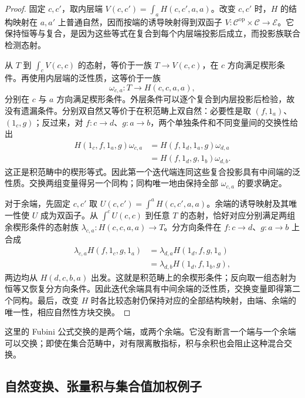 \begin{proof}
	固定 \(c,c'\)，取内层端 \(V(c,c')=\int_aH(c,c',a,a)\)。改变 \(c,c'\) 时，\(H\) 的结构映射在 \(a,a'\) 上普通自然，因而按端的诱导映射得到双函子 \(V:\mathcal C^{\mathrm{op}}\times\mathcal C\rightarrow\mathcal E\)。它保持恒等与复合，是因为这些等式在复合到每个内层端投影后成立，而投影族联合检测态射。

	从 \(T\) 到 \(\int_cV(c,c)\) 的态射，等价于一族 \(T\rightarrow V(c,c)\)，在 \(c\) 方向满足楔形条件。再使用内层端的泛性质，这等价于一族
	\[
		\omega_{c,a}:T\longrightarrow H(c,c,a,a),
	\]
	分别在 \(c\) 与 \(a\) 方向满足楔形条件。外层条件可以逐个复合到内层投影后检验，故没有遗漏条件。分别双自然又等价于在积范畴上双自然：必要性是取 \((f,1_a)\)、\((1_c,g)\)；反过来，对 \(f:c\rightarrow d\)、\(g:a\rightarrow b\)，两个单独条件和不同变量间的交换性给出
	\[
		\begin{aligned}
			H(1_c,f,1_a,g)\omega_{c,a}
			&=H(f,1_d,1_a,g)\omega_{d,a}\\
			&=H(f,1_d,g,1_b)\omega_{d,b}.
		\end{aligned}
	\]
	这正是积范畴中的楔形等式。因此第一个迭代端连同这些复合投影具有中间端的泛性质。交换两组变量得另一个同构；同构唯一地由保持全部 \(\omega_{c,a}\) 的要求确定。

	对于余端，先固定 \(c,c'\) 取 \(U(c,c')=\int^aH(c,c',a,a)\)。余端的诱导映射及其唯一性使 \(U\) 成为双函子。从 \(\int^cU(c,c)\) 到任意 \(T\) 的态射，恰好对应分别满足两组余楔形条件的态射族 \(\lambda_{c,a}:H(c,c,a,a)\rightarrow T\)。分方向条件在 \(f:c\rightarrow d\)、\(g:a\rightarrow b\) 上合成
	\[
		\begin{aligned}
			\lambda_{c,a}H(f,1_c,g,1_a)
			&=\lambda_{d,a}H(1_d,f,g,1_a)\\
			&=\lambda_{d,b}H(1_d,f,1_b,g),
		\end{aligned}
	\]
	两边均从 \(H(d,c,b,a)\) 出发。这就是积范畴上的余楔形条件；反向取一组态射为恒等又恢复分方向条件。因此迭代余端具有中间余端的泛性质，交换变量即得第二个同构。最后，改变 \(H\) 时各比较态射仍保持对应的全部结构映射，由端、余端的唯一性，相应自然性方块交换。
\end{proof}

这里的 Fubini 公式交换的是两个端，或两个余端。它没有断言一个端与一个余端可以交换；即使在集合范畴中，对有限离散指标，积与余积也会阻止这种混合交换。

\subsection{自然变换、张量积与集合值加权例子}
\label{b4:subsec:0306:03}

